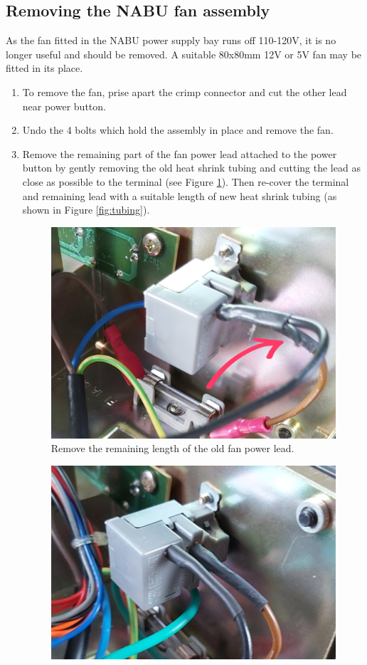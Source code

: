 \documentclass[twocolumn]{article}
\begin{document}
		\subsection{Removing the NABU fan assembly}
		As the fan fitted in the NABU power supply bay runs off 110-120V, it is no longer useful and should be removed. A suitable 80x80mm 12V or 5V fan may be fitted in its place.
		\begin{enumerate}
			\item  To remove the fan, prise apart the crimp connector and cut the other lead near power button.
			\item Undo the 4 bolts which hold the assembly in place and remove the fan.
			\item Remove the remaining part of the fan power lead attached to the power button by gently removing the old heat shrink tubing and cutting the lead as close as possible to the terminal (see Figure \ref{fig:fan}). Then re-cover the terminal and remaining lead with a suitable length of new heat shrink tubing (as shown in Figure \ref{fig:tubing}).
			\begin{figure}[h!]
				\includegraphics[width=\columnwidth]{images/psu-image-1a.jpg}
				\caption{Remove the remaining length of the old fan power lead.}
				\label{fig:fan}
			\end{figure}
			\begin{figure}[h!]
				\includegraphics[width=\columnwidth]{images/psu-image-1b.jpg}

\end{figure}
\end{enumerate}
\end{document}
